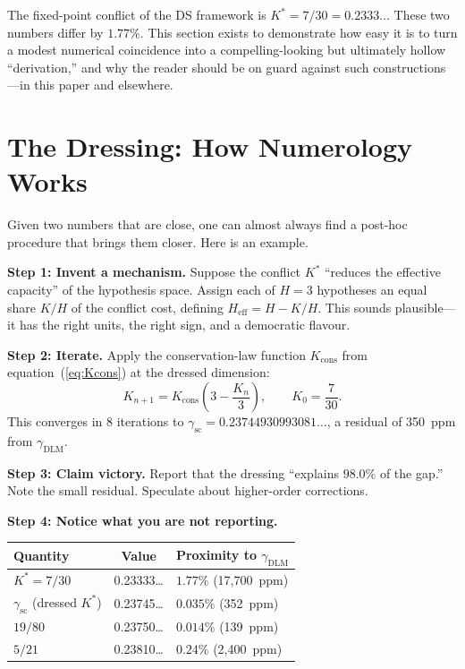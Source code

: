 \documentclass[11pt,a4paper]{article}
\theoremstyle{definition}
\theoremstyle{remark}
\begin{document}
The fixed-point conflict of the DS framework is $K^*=7/30=0.2333\ldots$ These two numbers differ by $1.77\%$. This section exists to demonstrate how easy it is to turn a modest numerical coincidence into a compelling-looking but ultimately hollow ``derivation,'' and why the reader should be on guard against such constructions---in this paper and elsewhere.


\section{The Dressing: How Numerology Works}\label{sec:dressing}

Given two numbers that are close, one can almost always find a post-hoc procedure that brings them closer. Here is an example.

\textbf{Step 1: Invent a mechanism.} Suppose the conflict $K^*$ ``reduces the effective capacity'' of the hypothesis space. Assign each of $H=3$ hypotheses an equal share $K/H$ of the conflict cost, defining $H_{\mathrm{eff}}=H-K/H$. This sounds plausible---it has the right units, the right sign, and a democratic flavour.

\textbf{Step 2: Iterate.} Apply the conservation-law function $K_{\mathrm{cons}}$ from equation~(\ref{eq:Kcons}) at the dressed dimension:
\[
K_{n+1}=K_{\mathrm{cons}}\!\left(3-\frac{K_n}{3}\right),\qquad K_0=\frac{7}{30}.
\]
This converges in 8 iterations to $\gamma_{\mathrm{sc}}=0.23744930993081\ldots$, a residual of 350~ppm from $\gamma_{\mathrm{DLM}}$.

\textbf{Step 3: Claim victory.} Report that the dressing ``explains $98.0\%$ of the gap.'' Note the small residual. Speculate about higher-order corrections.

\textbf{Step 4: Notice what you are not reporting.}

\begin{center}
\begin{tabular}{lcl}
\toprule
Quantity & Value & Proximity to $\gamma_{\mathrm{DLM}}$ \\
\midrule
$K^*=7/30$ & 0.23333\ldots & $1.77\%$ (17{,}700~ppm) \\
$\gamma_{\mathrm{sc}}$ (dressed $K^*$) & 0.23745\ldots & $0.035\%$ (352~ppm) \\
$19/80$ & 0.23750\ldots & $0.014\%$ (139~ppm) \\
$5/21$ & 0.23810\ldots & $0.24\%$ (2{,}400~ppm) \\
\bottomrule
\end{tabular}
\end{center}
\end{document}
